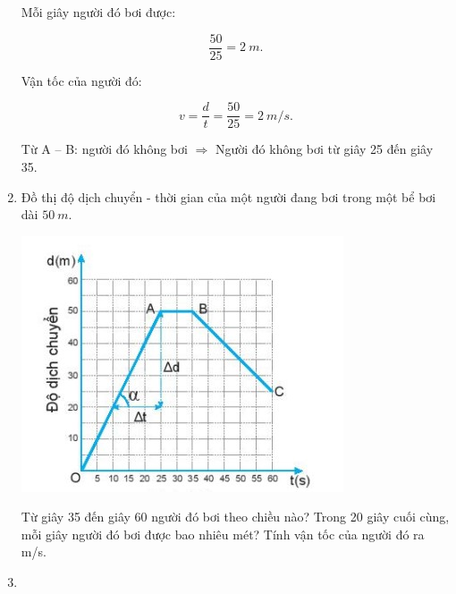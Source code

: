 \begin{enumerate}[label=\bfseries Câu \arabic*:]
{		Mỗi giây người đó bơi được:
		
		$$\dfrac{50}{25} = \SI{2}{m}.$$
		
		Vận tốc của người đó:
		
		$$v = \dfrac{d}{t} = \dfrac{50}{25} = \SI{2}{m/s}.$$
		
		Từ A – B: người đó không bơi $\Rightarrow$ Người đó không bơi từ giây 25 đến giây 35.
	
	}
		\item {}
	
	{
		Đồ thị độ dịch chuyển - thời gian của một người đang bơi trong một bể bơi dài $\SI{50}{m}$. 
		\begin{center}
			\includegraphics[scale=1]{../figs/VN10-2022-PH-TP006-2.jpg}
		\end{center}
	}
	Từ giây 35 đến giây 60 người đó bơi theo chiều nào? Trong 20 giây cuối cùng, mỗi giây người đó bơi được bao nhiêu mét? Tính vận tốc của người đó ra m/s.
		\item {}
	

\end{enumerate}
